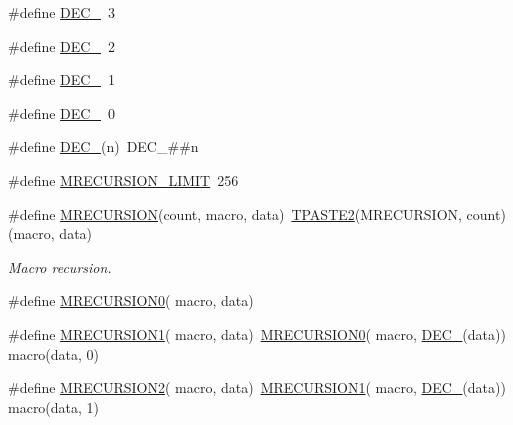 \begin{DoxyCompactItemize}
\item 
\#define \mbox{\hyperlink{group__group__sam0__utils__mrecursion_gad7e2e1a9550d96b04bdc72f130d39b47}{D\+E\+C\+\_}}~3
\item 
\#define \mbox{\hyperlink{group__group__sam0__utils__mrecursion_ga5fb5d565ab4804779b887b1ae50fe793}{D\+E\+C\+\_}}~2
\item 
\#define \mbox{\hyperlink{group__group__sam0__utils__mrecursion_gaf4b9ebe713bf0f2f3028babcd538e83e}{D\+E\+C\+\_}}~1
\item 
\#define \mbox{\hyperlink{group__group__sam0__utils__mrecursion_gadd8cf94f6ebfd2e525f0a920d25bc164}{D\+E\+C\+\_}}~0
\item 
\#define \mbox{\hyperlink{group__group__sam0__utils__mrecursion_ga1d23d683797679dca8c3512a54a5dcae}{D\+E\+C\+\_\+}}(n)~D\+E\+C\+\_\+\#\#n
\item 
\#define \mbox{\hyperlink{group__group__sam0__utils__mrecursion_ga8738104d47c117b0a7172dbe799ca9ff}{M\+R\+E\+C\+U\+R\+S\+I\+O\+N\+\_\+\+L\+I\+M\+IT}}~256
\item 
\#define \mbox{\hyperlink{group__group__sam0__utils__mrecursion_ga8856265949fb54fdffc8b9ea53a647e8}{M\+R\+E\+C\+U\+R\+S\+I\+ON}}(count,  macro,  data)~\mbox{\hyperlink{group__group__sam0__utils__tpaste_ga55fb148844f5ba993a992b609728e82e}{T\+P\+A\+S\+T\+E2}}(M\+R\+E\+C\+U\+R\+S\+I\+ON, count) (macro, data)
\begin{DoxyCompactList}\small\item\em Macro recursion. \end{DoxyCompactList}\item 
\#define \mbox{\hyperlink{group__group__sam0__utils__mrecursion_ga0b1614cba961bdbcc3fb084345a71ea8}{M\+R\+E\+C\+U\+R\+S\+I\+O\+N0}}( macro,  data)
\item 
\#define \mbox{\hyperlink{group__group__sam0__utils__mrecursion_ga322574b8596964c757cc58e54f42f102}{M\+R\+E\+C\+U\+R\+S\+I\+O\+N1}}( macro,  data)~\mbox{\hyperlink{group__group__sam0__utils__mrecursion_ga0b1614cba961bdbcc3fb084345a71ea8}{M\+R\+E\+C\+U\+R\+S\+I\+O\+N0}}(  macro, \mbox{\hyperlink{group__group__sam0__utils__mrecursion_ga1d23d683797679dca8c3512a54a5dcae}{D\+E\+C\+\_\+}}(data))   macro(data, 0)
\item 
\#define \mbox{\hyperlink{group__group__sam0__utils__mrecursion_gafe783fdf9d0ca650c910ca679e6b65f2}{M\+R\+E\+C\+U\+R\+S\+I\+O\+N2}}( macro,  data)~\mbox{\hyperlink{group__group__sam0__utils__mrecursion_ga322574b8596964c757cc58e54f42f102}{M\+R\+E\+C\+U\+R\+S\+I\+O\+N1}}(  macro, \mbox{\hyperlink{group__group__sam0__utils__mrecursion_ga1d23d683797679dca8c3512a54a5dcae}{D\+E\+C\+\_\+}}(data))   macro(data, 1)

\end{DoxyCompactItemize}
